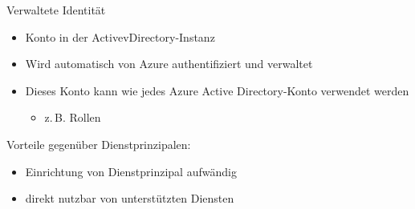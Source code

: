 \begin{flashcard}[Definition]{Verwaltete Identität}
        \begin{itemize}
            \item Konto in der ActivevDirectory-Instanz
            \item Wird automatisch von Azure authentifiziert und verwaltet
            \item Dieses Konto kann wie jedes Azure Active Directory-Konto verwendet werden
                \begin{itemize}
                    \item z.\,B. Rollen
                \end{itemize}
        \end{itemize}
        Vorteile gegenüber Dienstprinzipalen:
        \begin{itemize}
            \item Einrichtung von Dienstprinzipal aufwändig
            \item direkt nutzbar von unterstützten Diensten
        \end{itemize}
\end{flashcard}
